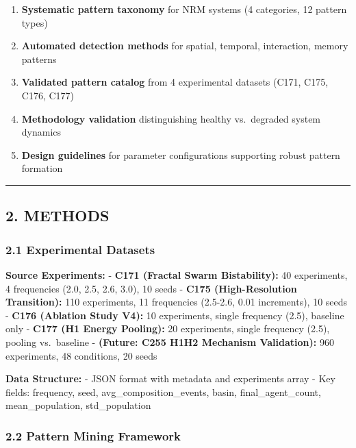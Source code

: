\documentclass[
]{article}
\providecommand{\tightlist}{%
  \setlength{\itemsep}{0pt}\setlength{\parskip}{0pt}}
\begin{document}
\begin{enumerate}
\def\labelenumi{\arabic{enumi}.}
\tightlist
\item
  \textbf{Systematic pattern taxonomy} for NRM systems (4 categories, 12
  pattern types)
\item
  \textbf{Automated detection methods} for spatial, temporal,
  interaction, memory patterns
\item
  \textbf{Validated pattern catalog} from 4 experimental datasets (C171,
  C175, C176, C177)
\item
  \textbf{Methodology validation} distinguishing healthy vs.~degraded
  system dynamics
\item
  \textbf{Design guidelines} for parameter configurations supporting
  robust pattern formation
\end{enumerate}

\begin{center}\rule{0.5\linewidth}{0.5pt}\end{center}

\subsection{2. METHODS}\label{methods}

\subsubsection{2.1 Experimental Datasets}\label{experimental-datasets}

\textbf{Source Experiments:} - \textbf{C171 (Fractal Swarm
Bistability):} 40 experiments, 4 frequencies (2.0, 2.5, 2.6, 3.0), 10
seeds - \textbf{C175 (High-Resolution Transition):} 110 experiments, 11
frequencies (2.5-2.6, 0.01 increments), 10 seeds - \textbf{C176
(Ablation Study V4):} 10 experiments, single frequency (2.5), baseline
only - \textbf{C177 (H1 Energy Pooling):} 20 experiments, single
frequency (2.5), pooling vs.~baseline - \textbf{(Future: C255 H1H2
Mechanism Validation):} 960 experiments, 48 conditions, 20 seeds

\textbf{Data Structure:} - JSON format with metadata and experiments
array - Key fields: frequency, seed, avg\_composition\_events, basin,
final\_agent\_count, mean\_population, std\_population

\subsubsection{2.2 Pattern Mining
Framework}\label{pattern-mining-framework}
\end{document}
